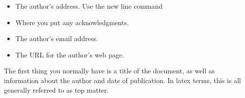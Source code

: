 	\begin{itemize}
		\item  The author's address.  Use
		the new line command 
		\item Where you put any acknowledgments.
		\item The author's email address.
		\item The URL for the author's web page.
	\end{itemize}

	The first thing you normally have is a title of the document, as well as
	information about the author and date of publication. In latex terms,
	this is all generally referred to as top matter.
	
